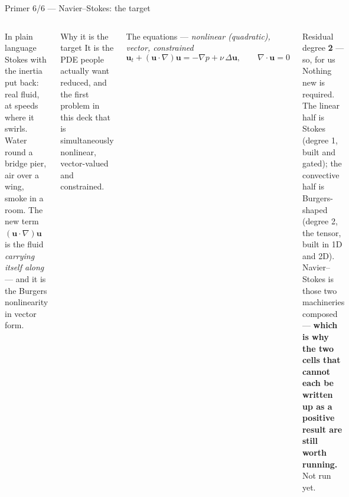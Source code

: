 \documentclass[10pt,aspectratio=169]{beamer}
\begin{document}
\begin{frame}{Primer 6/6 --- Navier--Stokes: the target}
  \footnotesize
  \begin{columns}[T]
    \begin{block}{In plain language}
      Stokes with the inertia put back: real fluid, at speeds where it swirls. Water round a bridge
      pier, air over a wing, smoke in a room. The new term $(\bm{u}\!\cdot\!\nabla)\bm{u}$ is the
      fluid \emph{carrying itself along} --- and it is the Burgers nonlinearity in vector form.
    \end{block}
    \begin{block}{Why it is the target}
      It is the PDE people actually want reduced, and the first problem in this deck that is
      simultaneously nonlinear, vector-valued and constrained.
    \end{block}
    \begin{block}{The equations --- \emph{nonlinear (quadratic), vector, constrained}}
      \[ \bm{u}_t + (\bm{u}\!\cdot\!\nabla)\bm{u} = -\nabla p + \nu\,\Delta\bm{u},
         \qquad \nabla\!\cdot\!\bm{u} = 0 \]
    \end{block}
    \begin{exampleblock}{Residual degree \textbf{2} --- so, for us}
      Nothing new is required. The linear half is Stokes (degree 1, built and gated); the convective
      half is Burgers-shaped (degree 2, the tensor, built in 1D and 2D). Navier--Stokes is those two
      machineries composed --- \textbf{which is why the two cells that cannot each be written up as a
      positive result are still worth running.} Not run yet.
    \end{exampleblock}
  \end{columns}
\end{frame}
\end{document}

